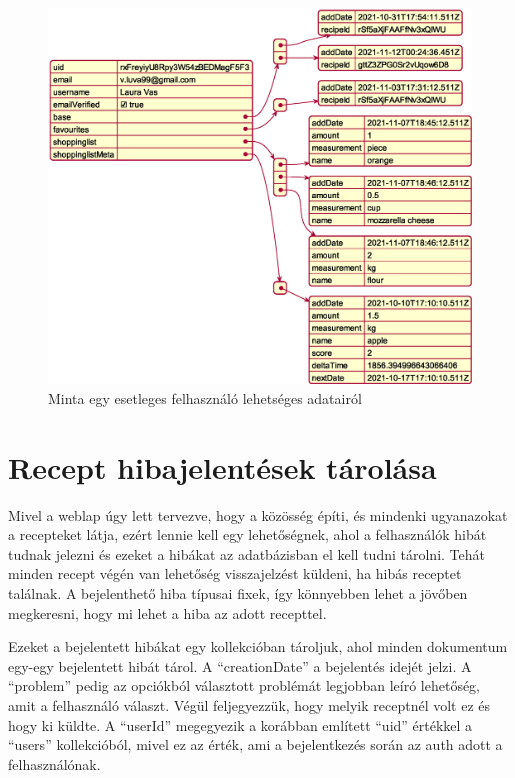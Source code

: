 \documentclass[12pt]{report}
\theoremstyle{definition}
\begin{document}
\noindent
\begin{figure}[H]
	\centering
	\includegraphics[width=\textwidth]{out/diagrams/jsonUsers/jsonUsers.eps}
	\caption{Minta egy esetleges felhasználó lehetséges adatairól}
    \label{fig:jsonUsers}
\end{figure}

\section{Recept hibajelentések tárolása} 
Mivel a weblap úgy lett tervezve, hogy a közösség építi, és mindenki ugyanazokat a recepteket látja, ezért lennie kell egy lehetőségnek, ahol a felhasználók hibát tudnak jelezni és ezeket a hibákat az adatbázisban el kell tudni tárolni. Tehát minden recept végén van lehetőség visszajelzést  küldeni, ha hibás receptet találnak. A bejelenthető hiba típusai fixek, így könnyebben lehet a jövőben megkeresni, hogy mi lehet a hiba az adott recepttel. 

Ezeket a bejelentett hibákat egy kollekcióban tároljuk, ahol minden dokumentum egy-egy bejelentett hibát tárol. A “creationDate” a bejelentés idejét jelzi. A “problem” pedig az opciókból választott problémát legjobban leíró lehetőség, amit a felhasználó választ. Végül feljegyezzük, hogy melyik receptnél volt ez és hogy ki küldte. A “userId” megegyezik a korábban említett “uid” értékkel a “users” kollekcióból, mivel ez az érték, ami a bejelentkezés során az auth adott a felhasználónak.
\end{document}
